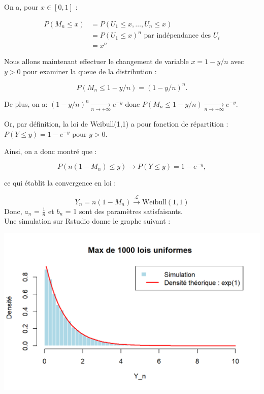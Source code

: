\documentclass{article}
\theoremstyle{plain}
\theoremstyle{definition}
\theoremstyle{plain}
\begin{document}
\noindent On a, pour $ x \in [0,1]$ :

\begin{align*}
	P(M_n \leq x) &= P(U_1 \leq x, \dots, U_n \leq x) \\
	&= P(U_1 \leq x)^n \text{ par indépendance des $U_i$}\\
	&= x^n
\end{align*}

\noindent Nous allons maintenant effectuer le changement de variable $ x = 1 - y/n $ avec $y > 0 $ pour examiner la queue de la distribution :

\[
P(M_n \leq 1 - y/n) = (1 - y/n)^n.
\]

\noindent De plus, on a: $(1 - y/n)^n \xrightarrow[n \to +\infty]{} e^{-y} $ donc $ P(M_n \leq 1 - y/n) \xrightarrow[n \to +\infty]{} e^{-y} $.


\noindent Or, par définition, la loi de Weibull(1,1) a pour fonction de répartition : $ P(Y \leq y) = 1 - e^{-y} \text{ pour } y > 0. $

\noindent Ainsi, on a donc montré que :

\[
P(n(1 - M_n) \leq y) \to P(Y \leq y) = 1 - e^{-y},
\]

\noindent ce qui établit la convergence en loi :

\[
Y_n = n(1 - M_n) \xrightarrow{\mathcal{L}} \text{Weibull}(1,1)
\] 
\noindent Donc, $a_n$ = $\frac{1}{n}$ et $b_n$ = 1 sont des paramètres satisfaisants. \\

\noindent Une simulation sur Rstudio donne le graphe suivant :

\begin{center}
	\includegraphics[scale=0.8]{./images/Max_Uniforme.png} 
\end{center}
\end{document}
